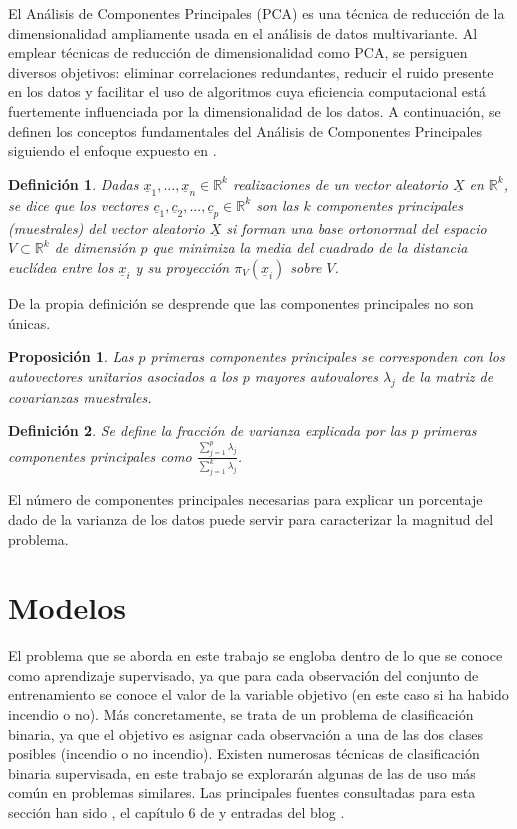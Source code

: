 \documentclass[12pt,a4paper,]{book}
\newcounter{dummy}
\numberwithin{dummy}{section}
\theoremstyle{ocrenumbox}
\theoremstyle{blacknumex}
\theoremstyle{blacknumbox}
\newtheorem{definitionT}{Definición}[section]  %
\theoremstyle{ocrenum}
\newtheorem{proposition}[dummy]{Proposición} %
\newenvironment{definition}{\begin{dBox}\begin{definitionT}}{\end{definitionT}\end{dBox}}
\theoremstyle{ocrenum}
\begin{document}
El Análisis de Componentes Principales (PCA) es una técnica de reducción
de la dimensionalidad ampliamente usada en el análisis de datos
multivariante. Al emplear técnicas de reducción de dimensionalidad como
PCA, se persiguen diversos objetivos: eliminar correlaciones
redundantes, reducir el ruido presente en los datos y facilitar el uso
de algoritmos cuya eficiencia computacional está fuertemente
influenciada por la dimensionalidad de los datos. A continuación, se
definen los conceptos fundamentales del Análisis de Componentes
Principales siguiendo el enfoque expuesto en \citet{PCAShaoDeng}.

\begin{definition}
Dadas $\underline x_1, ..., \underline x_n \in \mathbb{R}^k$ realizaciones de un vector aleatorio $\underline X$ en $\mathbb{R}^k$, se dice que los vectores $\underline c_1, \underline c_2,...,\underline c_p \in \mathbb{R}^k$ son las $k$ componentes principales (muestrales) del vector aleatorio $\underline X$ si forman una base ortonormal del espacio $V \subset \mathbb{R}^k$ de dimensión $p$ que minimiza la media del cuadrado de la distancia euclídea entre los $\underline x_i$ y su proyección $\pi_{V}(\underline x_i)$ sobre $V$.
\end{definition}

De la propia definición se desprende que las componentes principales no
son únicas.

\begin{proposition}
Las $p$ primeras componentes principales se corresponden con los autovectores unitarios asociados a los $p$ mayores autovalores $\lambda_j$ de la matriz de covarianzas muestrales. 
\end{proposition}

\begin{definition}
Se define la fracción de varianza explicada por las $p$ primeras componentes principales como $\frac{\sum_{j=1}^p \lambda_j}{\sum_{j=1}^k \lambda_j}$.
\end{definition}

El número de componentes principales necesarias para explicar un
porcentaje dado de la varianza de los datos puede servir para
caracterizar la magnitud del problema.

\hypertarget{modelos}{%
\section{Modelos}\label{modelos}}

El problema que se aborda en este trabajo se engloba dentro de lo que se
conoce como aprendizaje supervisado, ya que para cada observación del
conjunto de entrenamiento se conoce el valor de la variable objetivo (en
este caso si ha habido incendio o no). Más concretamente, se trata de un
problema de clasificación binaria, ya que el objetivo es asignar cada
observación a una de las dos clases posibles (incendio o no incendio).
Existen numerosas técnicas de clasificación binaria supervisada, en este
trabajo se explorarán algunas de las de uso más común en problemas
similares. Las principales fuentes consultadas para esta sección han
sido \citet{hastie2009elements}, el capítulo 6 de
\citet{MLmodelSuthaharan} y entradas del blog \citet{eight2late}.
\end{document}
